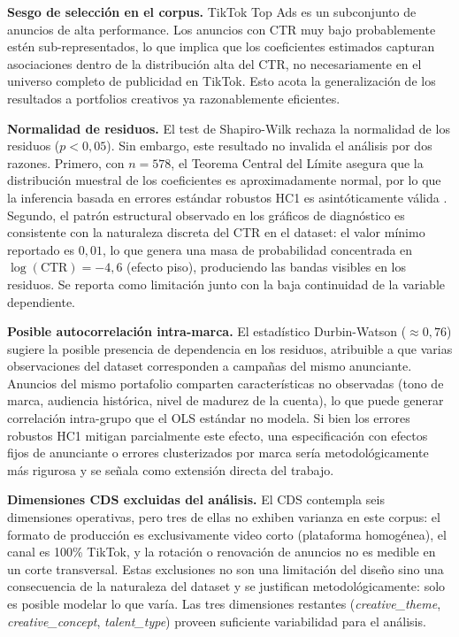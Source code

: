 \documentclass[12pt, a4paper]{report}
\begin{document}
\textbf{Sesgo de selección en el corpus.} TikTok Top Ads es un subconjunto de anuncios
de alta performance. Los anuncios con CTR muy bajo probablemente estén
sub-representados, lo que implica que los coeficientes estimados capturan asociaciones
dentro de la distribución alta del CTR, no necesariamente en el universo completo de
publicidad en TikTok. Esto acota la generalización de los resultados a portfolios creativos
ya razonablemente eficientes.

\textbf{Normalidad de residuos.} El test de Shapiro-Wilk rechaza la normalidad de los
residuos ($p < 0{,}05$). Sin embargo, este resultado no invalida el análisis por dos
razones. Primero, con $n = 578$, el Teorema Central del Límite asegura que la
distribución muestral de los coeficientes es aproximadamente normal, por lo que la
inferencia basada en errores estándar robustos HC1 es asintóticamente válida
\citep{fox2016}. Segundo, el patrón estructural observado en los gráficos de diagnóstico
es consistente con la naturaleza discreta del CTR en el dataset: el valor mínimo reportado
es $0{,}01$, lo que genera una masa de probabilidad concentrada en $\log(\text{CTR}) = -4{,}6$
(efecto piso), produciendo las bandas visibles en los residuos. Se reporta como limitación
junto con la baja continuidad de la variable dependiente.

\textbf{Posible autocorrelación intra-marca.} El estadístico Durbin-Watson ($\approx 0{,}76$)
sugiere la posible presencia de dependencia en los residuos, atribuible a que varias
observaciones del dataset corresponden a campañas del mismo anunciante. Anuncios del
mismo portafolio comparten características no observadas (tono de marca, audiencia
histórica, nivel de madurez de la cuenta), lo que puede generar correlación intra-grupo
que el OLS estándar no modela. Si bien los errores robustos HC1 mitigan parcialmente
este efecto, una especificación con efectos fijos de anunciante o errores clusterizados por
marca sería metodológicamente más rigurosa y se señala como extensión directa del
trabajo.

\textbf{Dimensiones CDS excluidas del análisis.} El CDS contempla seis dimensiones
operativas, pero tres de ellas no exhiben varianza en este corpus: el formato de producción
es exclusivamente video corto (plataforma homogénea), el canal es 100\% TikTok, y la
rotación o renovación de anuncios no es medible en un corte transversal. Estas exclusiones
no son una limitación del diseño sino una consecuencia de la naturaleza del dataset y se
justifican metodológicamente: solo es posible modelar lo que varía. Las tres dimensiones
restantes (\textit{creative\_theme}, \textit{creative\_concept}, \textit{talent\_type}) proveen
suficiente variabilidad para el análisis.
\end{document}
